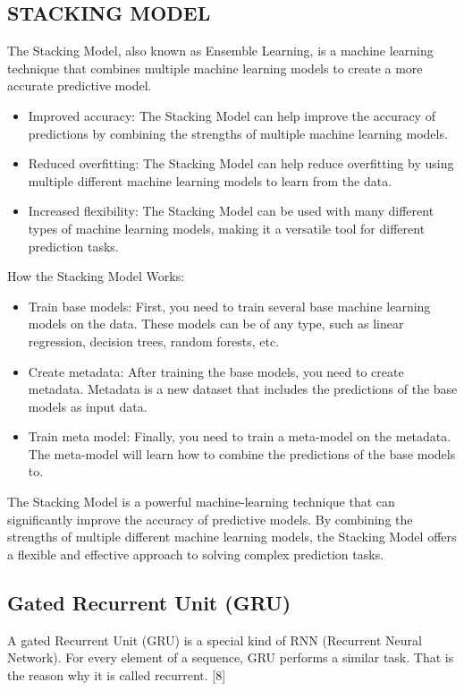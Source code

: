 \documentclass{ieeeojies}
\begin{document}
\subsection{STACKING MODEL} 
The Stacking Model, also known as Ensemble Learning, is a machine learning technique that combines multiple machine learning models to create a more accurate predictive model.
\begin{itemize}
    \item Improved accuracy: The Stacking Model can help improve the accuracy of predictions by combining the strengths of multiple machine learning models.
    \item Reduced overfitting: The Stacking Model can help reduce overfitting by using multiple different machine learning models to learn from the data.
    \item Increased flexibility: The Stacking Model can be used with many different types of machine learning models, making it a versatile tool for different prediction tasks.
\end{itemize}
How the Stacking Model Works:
\begin{itemize}
    \item Train base models: First, you need to train several base machine learning models on the data. These models can be of any type, such as linear regression, decision trees, random forests, etc.
    \item  Create metadata: After training the base models, you need to create metadata. Metadata is a new dataset that includes the predictions of the base models as input data.
    \item Train meta model: Finally, you need to train a meta-model on the metadata. The meta-model will learn how to combine the predictions of the base models to.
\end{itemize}
The Stacking Model is a powerful machine-learning technique that can significantly improve the accuracy of predictive models. By combining the strengths of multiple different machine learning models, the Stacking Model offers a flexible and effective approach to solving complex prediction tasks.

\subsection{Gated Recurrent Unit (GRU)} 
A gated Recurrent Unit (GRU) is a special kind of RNN (Recurrent Neural Network). For every element of a sequence, GRU performs a similar task. That is the reason why it is called recurrent. [8] \par
\noindent
\end{document}

